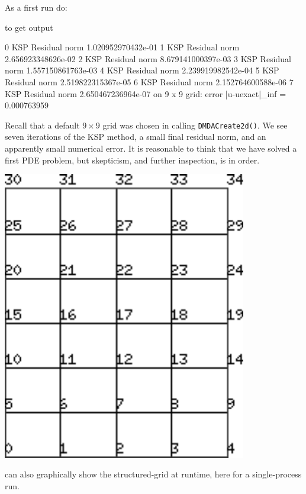 As a first run do:
to get output
\begin{cline}
  0 KSP Residual norm 1.020952970432e-01 
  1 KSP Residual norm 2.656923348626e-02 
  2 KSP Residual norm 8.679141000397e-03 
  3 KSP Residual norm 1.557150861763e-03 
  4 KSP Residual norm 2.239919982542e-04 
  5 KSP Residual norm 2.519822315367e-05 
  6 KSP Residual norm 2.152764600588e-06 
  7 KSP Residual norm 2.650467236964e-07 
on 9 x 9 grid:  error |u-uexact|_inf = 0.000763959
\end{cline}
Recall that a default $9$ grid was chosen in calling \texttt{DMDACreate2d()}.  We see seven iterations of the KSP method, a small final residual norm, and an apparently small numerical error.  It is reasonable to think that we have solved a first PDE problem, but skepticism, and further inspection, is in order.

\begin{marginfigure}
\bigskip
\includegraphics[width=0.8\textwidth]{dmM5N7}
\caption{\PETSc can also graphically show the structured-grid \pDMDA at runtime, here for a single-process run.}
\label{fig:dmM5N7}
\end{marginfigure}

